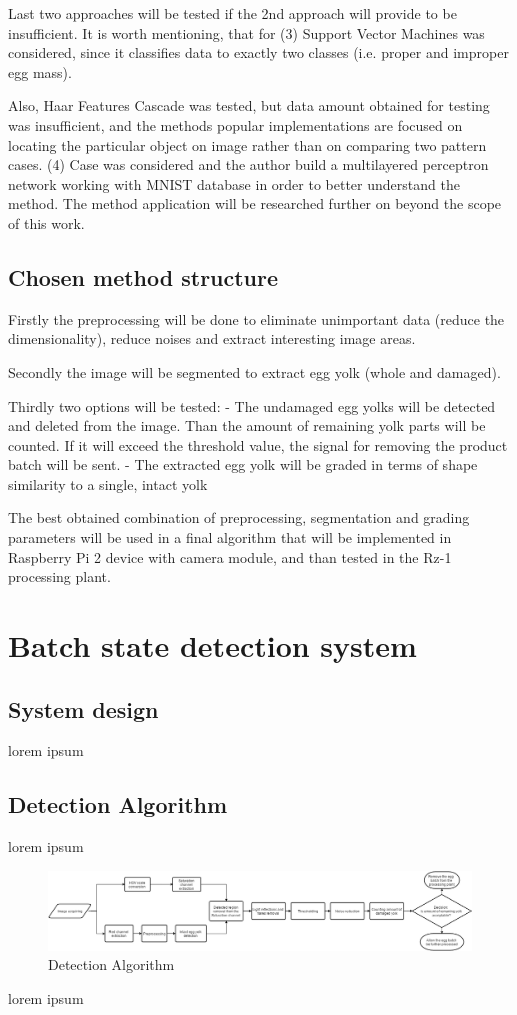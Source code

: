 \documentclass[12pt,twoside,a4paper]{article}
\begin{document}
Last two approaches will be tested if the 2nd approach will provide to be insufficient.
It is worth mentioning, that for (3) Support Vector Machines was considered, since it classifies data to exactly two classes (i.e. proper and improper egg mass).

Also, Haar Features Cascade was tested, but data amount obtained for testing was insufficient, and the methods popular implementations are focused on locating the particular object on image rather than on comparing two pattern cases.
(4) Case was considered and the author build a multilayered perceptron network working with MNIST database in order to better understand the method.
The method application will be researched further on beyond the scope of this work.





\subsection{Chosen method structure}

Firstly the preprocessing will be done to eliminate unimportant data (reduce the dimensionality), reduce noises and extract interesting image areas.

Secondly the image will be segmented to extract egg yolk (whole and damaged).

Thirdly two options will be tested:
- The undamaged egg yolks will be detected and deleted from the image. Than the amount of remaining yolk parts will be counted. If it will exceed the threshold value, the signal for removing the product batch will be sent.
- The extracted egg yolk will be graded in terms of shape similarity to a single, intact yolk

The best obtained combination of preprocessing, segmentation and grading parameters will be used in a final algorithm that will be implemented in Raspberry Pi 2 device with camera module, and than tested in the Rz-1 processing plant.
\section{Batch state detection system}
\subsection{System design}
lorem ipsum
\subsection{Detection Algorithm}
lorem ipsum
\begin{figure}[H]
\centering
\includegraphics[width=0.8\paperwidth]{algorithm}
\caption{Detection Algorithm}
\end{figure}
lorem ipsum
\end{document}
